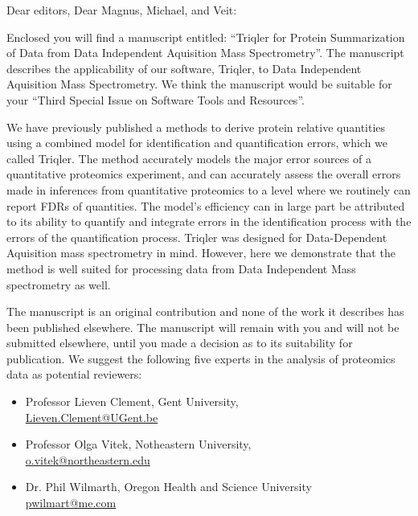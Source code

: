 \documentclass[a4paper]{letter}
\begin{document}
\begin{letter}{}
\vspace*{-5.0cm}

\opening{Dear editors, Dear Magnus, Michael, and Veit:}

Enclosed you will find a manuscript entitled: 
``Triqler for Protein Summarization of Data from Data Independent Aquisition Mass Spectrometry''. 
The manuscript describes the applicability of our software, Triqler, to Data Independent Aquisition Mass Spectrometry. We think the manuscript would be suitable for
your ``Third Special Issue on Software Tools and Resources''. 

We have previously published a methods to derive protein relative quantities 
using a combined model for identification and quantification
errors, which we called Triqler. 
The method accurately models the major error sources of a
quantitative proteomics experiment, and can accurately assess the overall errors
made in inferences from quantitative proteomics to a level where we routinely
can report FDRs of quantities. The model's efficiency can in large part be
attributed to its ability to quantify and integrate errors in the identification
process with the errors of the quantification process.
Triqler was designed for Data-Dependent Aquisition mass spectrometry in mind. 
However, here we demonstrate that the method is well suited for processing data from Data Independent Mass spectrometry as well. 
 
The manuscript is an original contribution and none of the work it
describes has been published elsewhere. The manuscript will
remain with you and will not be submitted elsewhere, until you made a
decision as to its suitability for publication.
We suggest the following five experts in the analysis of proteomics
data as potential reviewers:

\begin{itemize}

\item Professor Lieven Clement, Gent University, \\
\url{Lieven.Clement@UGent.be}

\item Professor Olga Vitek, Notheastern University, \\
\url{o.vitek@northeastern.edu}

\item Dr. Phil Wilmarth, Oregon Health and Science University\\
\url{pwilmart@me.com}


\end{itemize}
\end{letter}
\end{document}
